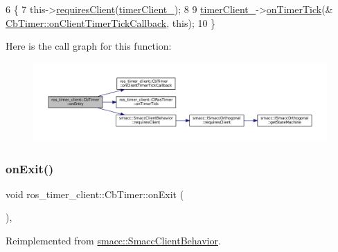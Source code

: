 \begin{DoxyCode}
6 \{
7     this->\hyperlink{classsmacc_1_1SmaccClientBehavior_a917f001e763a1059af337bf4e164f542}{requiresClient}(\hyperlink{classros__timer__client_1_1CbTimer_a370d115a7423db45ca375673db8a4ed1}{timerClient\_});
8 
9     \hyperlink{classros__timer__client_1_1CbTimer_a370d115a7423db45ca375673db8a4ed1}{timerClient\_}->\hyperlink{classros__timer__client_1_1ClRosTimer_a06ecf6427b5df59f29879ab3bd1f120c}{onTimerTick}(&
      \hyperlink{classros__timer__client_1_1CbTimer_ad75f8dfb3baa32e3ba7d373e8d902b47}{CbTimer::onClientTimerTickCallback}, \textcolor{keyword}{this});
10 \}
\end{DoxyCode}
Here is the call graph for this function\+:
\nopagebreak
\begin{figure}[H]
\begin{center}
\leavevmode
\includegraphics[width=350pt]{classros__timer__client_1_1CbTimer_a25c086b5988642602938d92f9555ce18_cgraph}
\end{center}
\end{figure}
\mbox{\label{classros__timer__client_1_1CbTimer_a27d62ebacf667d4c2518c0416ee7b25b}} 
\subsubsection{\texorpdfstring{on\+Exit()}{onExit()}}
{\footnotesize\ttfamily void ros\+\_\+timer\+\_\+client\+::\+Cb\+Timer\+::on\+Exit (\begin{DoxyParamCaption}{ }\end{DoxyParamCaption})\hspace{0.3cm}{\ttfamily [override]}, {\ttfamily [virtual]}}



Reimplemented from \hyperlink{classsmacc_1_1SmaccClientBehavior_ac0cd72d42bd00425362a97c9803ecce5}{smacc\+::\+Smacc\+Client\+Behavior}.



